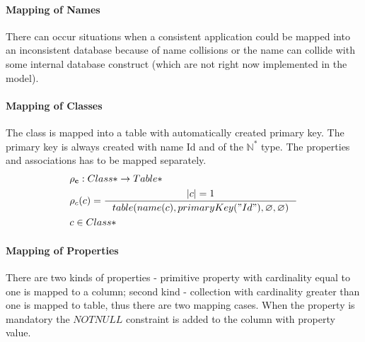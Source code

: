 \documentclass[11pt]{article}
\begin{document}
\paragraph{Mapping of Names} There can occur situations when a consistent application could be mapped into an inconsistent database because of name collisions or the name can collide with some internal database construct (which are not right now implemented in the model).



\paragraph{Mapping of Classes} The class is mapped into a table with  automatically created primary key. The primary key is always created with name Id and of the $\mathbb{N^{*}}$ type. The properties and associations has to be mapped separately.
\begin{align*}
&	\mathbf{\rho_{c}} : Class*  \rightarrow Table* \\
&	\rho_{c}(c) = %
		\inference{|c| = 1}{table(name(c), primaryKey("Id"), \varnothing, \varnothing)} %
\\ 	
& c \in Class*
\end{align*}

\paragraph{Mapping of Properties}
There are two kinds of properties - primitive property with cardinality equal to one is mapped to a column; second kind - collection with cardinality greater than one is mapped to table, thus there are two mapping cases. When the property is mandatory the $NOTNULL$ constraint is added to the column with property value. 
\end{document}
